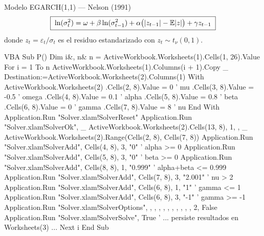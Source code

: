 \documentclass{claudeeditorial}
\begin{document}
\BodyCopy
\ClaudeCover


\begin{claudehero}
\end{claudehero}

\begin{ClaudeCard}{Modelo EGARCH(1,1) — Nelson (1991)}
\[
  \boxed{\;\ln(\sigma_t^2) = \omega + \beta\ln(\sigma_{t-1}^2) + \alpha\bigl(\lvert z_{t-1}\rvert - \mathbb{E}\lvert z\rvert\bigr) + \gamma z_{t-1}\;}
\]
donde $z_t = \varepsilon_t / \sigma_t$ es el residuo estandarizado con $z_t \sim t_\nu(0,1)$.
\end{ClaudeCard}


\begin{ClaudeCode}[title={Sub P() — bucle MLE sobre todas las series con Solver}]{VBA}
Sub P()
Dim i&, n&
n = ActiveWorkbook.Worksheets(1).Cells(1, 26).Value
For i = 1 To n
    ActiveWorkbook.Worksheets(1).Columns(i + 1).Copy _
        Destination:=ActiveWorkbook.Worksheets(2).Columns(1)
    With ActiveWorkbook.Worksheets(2)
        .Cells(2, 8).Value = 0       ' mu
        .Cells(3, 8).Value = -0.5    ' omega
        .Cells(4, 8).Value = 0.1     ' alpha
        .Cells(5, 8).Value = 0.8     ' beta
        .Cells(6, 8).Value = 0       ' gamma
        .Cells(7, 8).Value = 8       ' nu
    End With
    Application.Run "Solver.xlam!SolverReset"
    Application.Run "Solver.xlam!SolverOk", _
        ActiveWorkbook.Worksheets(2).Cells(13, 8), 1, , _
        ActiveWorkbook.Worksheets(2).Range(Cells(2, 8), Cells(7, 8))
    Application.Run "Solver.xlam!SolverAdd", Cells(4, 8), 3, "0"       ' alpha >= 0
    Application.Run "Solver.xlam!SolverAdd", Cells(5, 8), 3, "0"       ' beta  >= 0
    Application.Run "Solver.xlam!SolverAdd", Cells(8, 8), 1, "0.999"   ' alpha+beta <= 0.999
    Application.Run "Solver.xlam!SolverAdd", Cells(7, 8), 3, "2.001"   ' nu > 2
    Application.Run "Solver.xlam!SolverAdd", Cells(6, 8), 1, "1"       ' gamma <= 1
    Application.Run "Solver.xlam!SolverAdd", Cells(6, 8), 3, "-1"      ' gamma >= -1
    Application.Run "Solver.xlam!SolverOptions", , , , , , , , , , , 2, False
    Application.Run "Solver.xlam!SolverSolve", True
    ' ... persiste resultados en Worksheets(3) ...
Next i
End Sub
\end{ClaudeCode}
\end{document}

